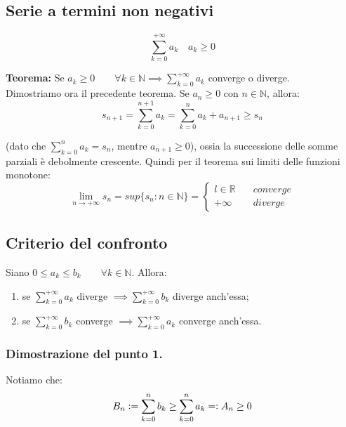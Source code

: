 \documentclass{article}
\begin{document}
\subsection{Serie a termini non negativi}
\begin{equation*}
    \sum_{k = 0}^{+\infty} a_k \quad a_k \geq 0
\end{equation*}

\noindent\textbf{Teorema: } Se $a_k \geq 0 \qquad \forall k \in \mathbb{N} \implies \sum_{k = 0}^{+\infty} a_k$ converge o diverge.\\

\noindent Dimostriamo ora il precedente teorema. Se $a_n \geq 0$ con $n \in \mathbb{N}$, allora:
\begin{equation*}
    s_{n + 1} = \sum_{k = 0}^{n + 1} a_k = \sum_{k = 0}^n a_k + a_{n + 1} \geq s_n
\end{equation*}

\noindent (dato che $\sum_{k = 0}^n a_k = s_n$, mentre $a_{n + 1} \geq 0$), ossia la successione delle somme parziali è debolmente crescente. Quindi per il teorema sui limiti delle funzioni monotone:
\begin{equation*}
    \lim_{n \to +\infty} s_n = sup\{s_n : n \in \mathbb{N}\} = \begin{cases}
        l \in \mathbb{R} & \quad converge \\
        +\infty & \quad diverge
    \end{cases}
\end{equation*}

\subsection{Criterio del confronto}
Siano $0 \leq a_k \leq b_k \qquad \forall k \in \mathbb{N}$. Allora:
\begin{enumerate}
    \item se $\sum_{k = 0}^{+\infty} a_k$ diverge $\implies \sum_{k = 0}^{+\infty} b_k$ diverge anch'essa;
    \item se $\sum_{k = 0}^{+\infty} b_k$ converge $\implies \sum_{k = 0}^{+\infty} a_k$ converge anch'essa.
\end{enumerate}

\subsubsection{Dimostrazione del punto 1.}
Notiamo che:
\begin{equation*}
    B_n \vcentcolon = \sum_{k = 0}^n b_k \geq \sum_{k = 0}^n a_k = \vcentcolon A_n \geq 0
\end{equation*}
\end{document}
